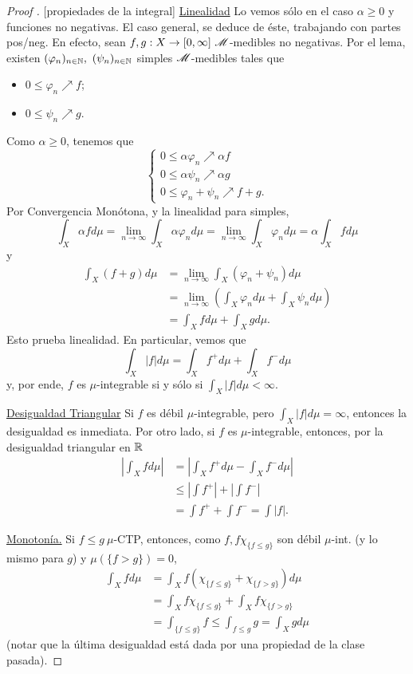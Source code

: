 \begin{proof}[Proof ][propiedades de la integral]
	\underline{Linealidad} Lo vemos sólo en el caso $\alpha \geq 0$ y funciones no negativas. El caso general, se deduce de éste, trabajando con partes pos/neg. En efecto, sean $f,g : X \to [0,\infty] \ \mathscr{M}$-medibles no negativas. Por el lema, existen $(\varphi_{n})_{n\in\N},\ (\psi_{n})_{n\in\N}$ simples $\mathscr{M}$-medibles tales que
	\begin{itemize}
		\item $0 \leq \varphi_{n} \nearrow f$;

		\item $0 \leq \psi_{n} \nearrow g$.
	\end{itemize}
	Como $\alpha \geq 0$, tenemos que
	\[ \begin{cases}
			0 \leq \alpha \varphi_{n} \nearrow \alpha f \\
			0 \leq \alpha \psi_{n} \nearrow \alpha g \\
			0 \leq \varphi_{n} + \psi_{n} \nearrow f + g.
		\end{cases} \]
	Por Convergencia Monótona, y la linealidad para simples,
	\[ \int_{X} \alpha f d\mu = \lim_{n \to \infty} \int_{X} \alpha \varphi_{n}d\mu = \lim_{n \to \infty} \int_{X} \varphi_{n} d\mu = \alpha \int_{X} f d\mu \]
	y
	\begin{align*}
		\int_{X} (f + g) d\mu &= \lim_{n \to \infty} \int_{X} (\varphi_{n} + \psi_{n}) d\mu \\
		&= \lim_{n \to \infty} \left( \int_{X} \varphi_{n} d\mu + \int_{X} \psi_{n} d\mu \right) \\
		&= \int_{X} f d\mu + \int_{X} g d\mu. 
	\end{align*}
	Esto prueba linealidad. En particular, vemos que
	\[ \int_{X} |f| d\mu = \int_{X} f^{+} d\mu + \int_{X} f^{-} d\mu \]
	y, por ende, $f$ es $\mu$-integrable si y sólo si $\int_{X} |f| d\mu < \infty$. \par
	\medskip
	\underline{Desigualdad Triangular} Si $f$ es débil $\mu$-integrable, pero $\int_{X}|f| d\mu = \infty$, entonces la desigualdad es inmediata. Por otro lado, si $f$ es $\mu$-integrable, entonces, por la desigualdad triangular en $\mathbb{R}$
	\begin{align*}
		\left| \int_{X} f d\mu \right| &= \left| \int_{X} f^{+} d\mu - \int_{X} f^{-} d\mu \right| \\
		&\leq \left| \int f^{+} \right| + \left| \int f^{-} \right| \\
		&= \int f^{+} + \int f^{-} = \int |f|
	.\end{align*}
	\par
	\underline{Monotonía.} Si $f \leq g \ \mu$-CTP, entonces, como $f, f \chi_{\{f \leq g\}}$ son débil $\mu$-int. (y lo mismo para $g$) y $\mu(\{f > g\} ) = 0$,
	\begin{align*}
		\int_{X} f d\mu &= \int_{X} f( \chi_{\{f \leq g\}} + \chi_{\{f > g\} }) d\mu \\
		&= \int_{X} f \chi_{\{f \leq g\}  } + \int_{X} f \chi_{\{f > g\}  } \\
		&= \int_{\{f \leq g\}  } f \leq \int_{f \leq g} g = \int_{X} g d\mu
	\end{align*}
	(notar que la última desigualdad está dada por una propiedad de la clase pasada).
\end{proof}
